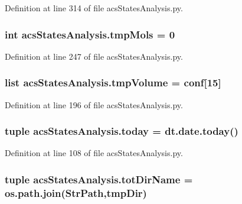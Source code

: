 Definition at line 314 of file acs\-States\-Analysis.\-py.

\hypertarget{a00130_aa24f8efad70335a8460f68902001ce64}{
\subsubsection[{tmp\-Mols}]{\setlength{\rightskip}{0pt plus 5cm}int acs\-States\-Analysis.\-tmp\-Mols = 0}}\label{a00130_aa24f8efad70335a8460f68902001ce64}


Definition at line 247 of file acs\-States\-Analysis.\-py.

\hypertarget{a00130_a1d189b8706c1c2299764d3cfd2ba08d9}{
\subsubsection[{tmp\-Volume}]{\setlength{\rightskip}{0pt plus 5cm}list acs\-States\-Analysis.\-tmp\-Volume = {\bf conf}\mbox{[}15\mbox{]}}}\label{a00130_a1d189b8706c1c2299764d3cfd2ba08d9}


Definition at line 196 of file acs\-States\-Analysis.\-py.

\hypertarget{a00130_ac99ee9d8196d8a2305b9f4c795b23b97}{
\subsubsection[{today}]{\setlength{\rightskip}{0pt plus 5cm}tuple acs\-States\-Analysis.\-today = dt.\-date.\-today()}}\label{a00130_ac99ee9d8196d8a2305b9f4c795b23b97}


Definition at line 108 of file acs\-States\-Analysis.\-py.

\hypertarget{a00130_af4bd99f6cdaec32f48ed0074208b4f0c}{
\subsubsection[{tot\-Dir\-Name}]{\setlength{\rightskip}{0pt plus 5cm}tuple acs\-States\-Analysis.\-tot\-Dir\-Name = os.\-path.\-join({\bf Str\-Path},tmp\-Dir)}}\label{a00130_af4bd99f6cdaec32f48ed0074208b4f0c}


